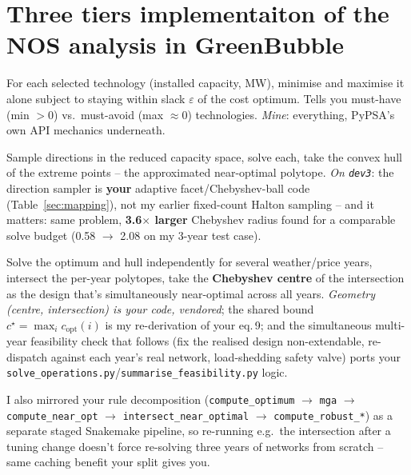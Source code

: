 \documentclass[11pt]{article}
\begin{document}
\section{Three tiers implementaiton of the NOS analysis in GreenBubble}
\label{sec:tiers}
\begin{description}[leftmargin=1.4em]
  \item[Tier 1 -- ranges.] For each selected technology (installed
    capacity, MW), minimise and maximise it alone subject to staying within
    slack $\varepsilon$ of the cost optimum. Tells you must-have
    (min $>0$) vs.\ must-avoid (max $\approx 0$) technologies.
    \emph{Mine}: everything, PyPSA's own API mechanics underneath.
  \item[Tier 2 -- hull.] Sample directions in the reduced capacity space,
    solve each, take the convex hull of the extreme points -- the
    approximated near-optimal polytope. \emph{On \texttt{dev3}}: the
    direction sampler is \textbf{your} adaptive facet/Chebyshev-ball code
    (Table~\ref{sec:mapping}), not my earlier fixed-count Halton sampling
    -- and it matters: same problem, \textbf{3.6$\times$ larger} Chebyshev
    radius found for a comparable solve budget (0.58 $\to$ 2.08 on my
    3-year test case).
  \item[Tier 3 -- robustness.] Solve the optimum and hull independently for
    several weather/price years, intersect the per-year polytopes, take the
    \textbf{Chebyshev centre} of the intersection as the design that's
    simultaneously near-optimal across all years. \emph{Geometry (centre,
    intersection) is your code, vendored}; the shared bound
    $c^\star=\max_i c_{\mathrm{opt}}(i)$ is my re-derivation of your
    eq.\,9; and the simultaneous multi-year feasibility check that follows
    (fix the realised design non-extendable, re-dispatch against each
    year's real network, load-shedding safety valve) ports your
    \texttt{solve\_operations.py}/\texttt{summarise\_feasibility.py} logic.
\end{description}

I also mirrored your rule decomposition (\texttt{compute\_optimum} $\to$
\texttt{mga} $\to$ \texttt{compute\_near\_opt} $\to$
\texttt{intersect\_near\_optimal} $\to$ \texttt{compute\_robust\_*}) as a
separate staged Snakemake pipeline, so re-running e.g.\ the intersection
after a tuning change doesn't force re-solving three years of networks from
scratch -- same caching benefit your split gives you.
\end{document}
